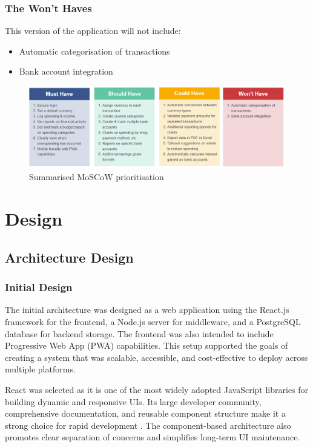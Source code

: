 \documentclass{l4proj}
\begin{document}
\subsection{The Won’t Haves}
This version of the application will not include:
\begin{itemize}
    \item Automatic categorisation of transactions
    \item Bank account integration
\end{itemize}

\begin{figure}[H]
    \centering
    \includegraphics[width=\linewidth]{images/moscow.png}
    \caption{Summarised MoSCoW prioritisation}
    \label{fig:moscow}
\end{figure}


\chapter{Design}
\section{Architecture Design}
\subsection{Initial Design}
The initial architecture was designed as a web application using the React.js framework for the frontend, a Node.js server for middleware, and a PostgreSQL database for backend storage. The frontend was also intended to include Progressive Web App (PWA) capabilities. This setup supported the goals of creating a system that was scalable, accessible, and cost-effective to deploy across multiple platforms.

React was selected as it is one of the most widely adopted JavaScript libraries for building dynamic and responsive UIs. Its large developer community, comprehensive documentation, and reusable component structure make it a strong choice for rapid development \citep{komodo_9_2022}. The component-based architecture also promotes clear separation of concerns and simplifies long-term UI maintenance.
\end{document}
